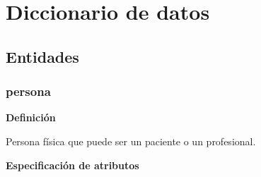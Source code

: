 \documentclass[a4paper,11pt]{article}
\begin{document}
%
%
%


\section{\textbf{Diccionario de datos}}

\subsection{\textbf{Entidades}}


\subsubsection{\textbf{persona}}

\textbf{Definición}

Persona física que puede ser un paciente o un profesional.

\textbf{Especificación de atributos}
\end{document}
